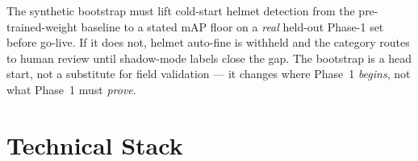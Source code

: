 \documentclass[11pt,a4paper]{article}
\begin{document}
\begin{callout}
The synthetic bootstrap must lift cold-start helmet detection from the pre-trained-weight baseline to a stated mAP floor on a \emph{real} held-out Phase-1 set before go-live. If it does not, helmet auto-fine is withheld and the category routes to human review until shadow-mode labels close the gap. The bootstrap is a head start, not a substitute for field validation --- it changes where Phase~1 \emph{begins}, not what Phase~1 must \emph{prove}.
\end{callout}

\section{Technical Stack}
\end{document}
